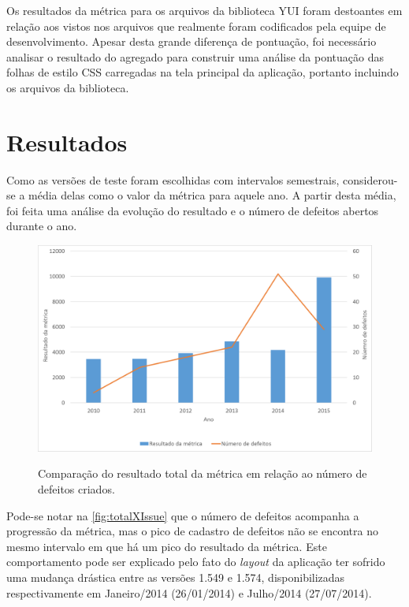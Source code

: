 
Os resultados da métrica para os arquivos da biblioteca YUI foram destoantes em relação aos vistos nos arquivos que realmente foram codificados pela equipe de desenvolvimento. Apesar desta grande diferença de pontuação, foi necessário  analisar o resultado do agregado para construir uma análise da pontuação das folhas de estilo CSS carregadas na tela principal da aplicação, portanto incluindo os arquivos da biblioteca.

\section{Resultados}

Como as versões de teste foram escolhidas com intervalos semestrais, considerou-se a média delas como o valor da métrica para aquele ano. A partir desta média, foi feita uma análise da evolução do resultado e o número de defeitos abertos durante o ano.

\begin{figure}[!htbp]
	\centering
	\caption{Comparação do resultado total da métrica em relação ao número de defeitos criados.}
	\includegraphics[width=1\textwidth]{./04-figuras/total_issues}
	\label{fig:totalXIssue}
\end{figure}

Pode-se notar na \autoref{fig:totalXIssue} que o número de defeitos acompanha a progressão da métrica, mas o pico de cadastro de defeitos não se encontra no mesmo intervalo em que há um pico do resultado da métrica. Este comportamento pode ser explicado pelo fato do \textit{layout} da aplicação ter sofrido uma mudança drástica entre as versões 1.549 e 1.574, disponibilizadas respectivamente em Janeiro/2014 (26/01/2014) e Julho/2014 (27/07/2014).

